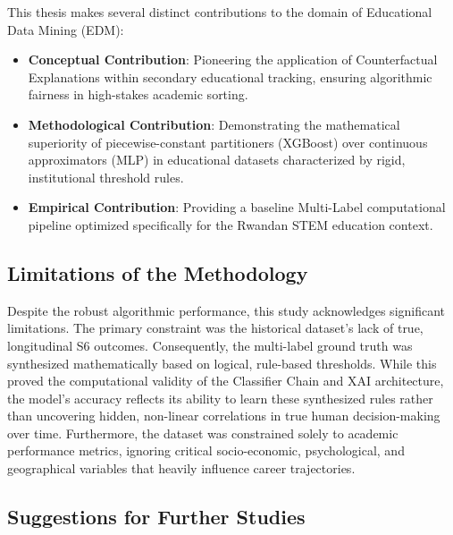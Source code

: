 This thesis makes several distinct contributions to the domain of Educational Data Mining \parencite{romero2010educational} (EDM):
\begin{itemize}
    \item \textbf{Conceptual Contribution}: Pioneering the application of Counterfactual \parencite{wachter2017counterfactual} Explanations within secondary educational tracking, ensuring algorithmic fairness in high-stakes academic sorting.
    \item \textbf{Methodological Contribution}: Demonstrating the mathematical superiority of piecewise-constant partitioners (XGBoost) over continuous approximators (MLP) in educational datasets characterized by rigid, institutional threshold rules.
    \item \textbf{Empirical Contribution}: Providing a baseline Multi-Label \parencite{tsoumakas2007multi} computational pipeline optimized specifically for the Rwandan STEM education context.
\end{itemize}

\subsection{Limitations of the Methodology}

Despite the robust algorithmic performance, this study acknowledges significant limitations. The primary constraint was the historical dataset's lack of true, longitudinal S6 outcomes. Consequently, the multi-label \parencite{tsoumakas2007multi} ground truth was synthesized mathematically based on logical, rule-based thresholds. While this proved the computational validity of the Classifier Chain \parencite{read2011classifier} and XAI architecture, the model's accuracy reflects its ability to learn these synthesized rules rather than uncovering hidden, non-linear correlations in true human decision-making over time. Furthermore, the dataset was constrained solely to academic performance metrics, ignoring critical socio-economic, psychological, and geographical variables that heavily influence career trajectories.

\subsection{Suggestions for Further Studies}


